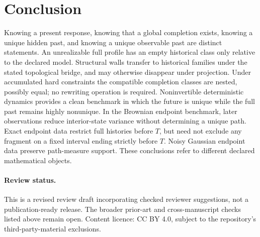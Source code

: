\documentclass[11pt]{article}
\begin{document}
\section*{Conclusion}
Knowing a present response, knowing that a global completion exists, knowing a unique hidden past, and knowing a unique observable past are distinct statements. An unrealizable full profile has an empty historical class only relative to the declared model. Structural walls transfer to historical families under the stated topological bridge, and may otherwise disappear under projection. Under accumulated hard constraints the compatible completion classes are nested, possibly equal; no rewriting operation is required. Noninvertible deterministic dynamics provides a clean benchmark in which the future is unique while the full past remains highly nonunique. In the Brownian endpoint benchmark, later observations reduce
interior-state variance without determining a unique path. Exact
endpoint data restrict full histories before $T$, but need not exclude
any fragment on a fixed interval ending strictly before $T$. Noisy
Gaussian endpoint data preserve path-measure support. These conclusions
refer to different declared mathematical objects.

\paragraph{Review status.}
This is a revised review draft incorporating checked reviewer
suggestions, not a publication-ready release.
The broader prior-art and cross-manuscript checks listed above remain
open. Content licence: CC BY 4.0, subject to the repository's
third-party-material exclusions.
\end{document}
